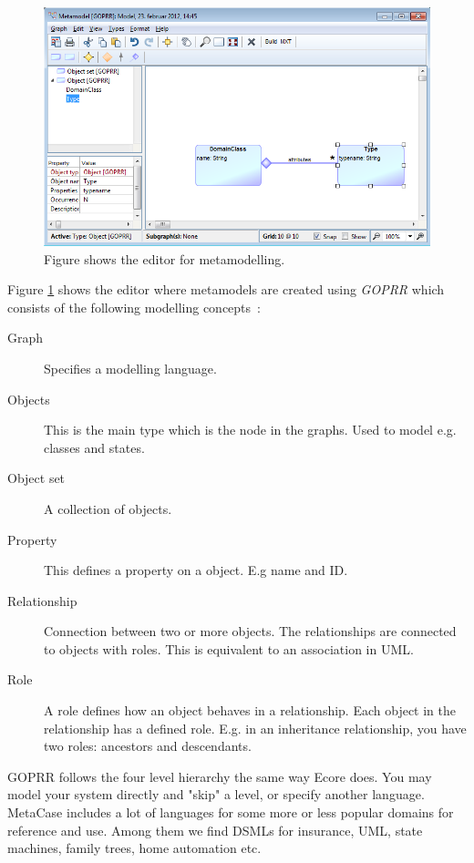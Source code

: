 \begin{figure}[hp]
  \centering
  \centerline{\includegraphics[scale=0.8]{images/me_mm_editor.png}}
  \caption[MetaEdit+ metamodel editor]{Figure shows the editor for metamodelling.}
  \label{fig:metacase_metamodel}
\end{figure}

Figure \ref{fig:metacase_metamodel} shows the editor where metamodels are created using \emph{GOPRR} which consists of the following modelling concepts~\cite{oprrmanual}:
\begin{description}
  \item[Graph] Specifies a modelling language.
  \item[Objects] This is the main type which is the node in the graphs. Used to model e.g. classes and states.
  \item[Object set] A collection of objects.
  \item[Property] This defines a property on a object. E.g name and ID.
  \item[Relationship] Connection between two or more objects. The relationships are connected to objects with roles. This is equivalent to an association in UML. 
  \item[Role] A role defines how an object behaves in a relationship. Each object in the relationship has a defined role. E.g. in an inheritance relationship, you have two roles: ancestors and descendants.
\end {description} 
GOPRR follows the four level hierarchy the same way Ecore does. You may model your system directly and "skip" a level, or specify another language. MetaCase includes a lot of languages for some more or less popular domains for reference and use. Among them we find DSMLs for insurance, UML, state machines, family trees, home automation etc.

